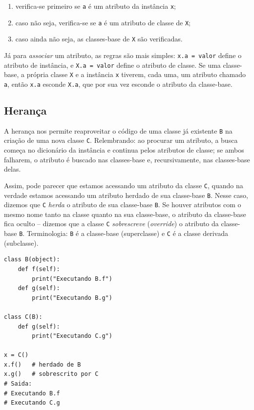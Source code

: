 \documentclass[11pt,a4paper]{article}
\begin{document}
\begin{enumerate}
\item verifica-se primeiro se \texttt{a} é um atributo da instância \texttt{x};
\item caso não seja, verifica-se se \texttt{a} é um atributo de classe de \texttt{X};
\item caso ainda não seja, as classes-base de \texttt{X} são verificadas.
\end{enumerate}

Já para \emph{associar} um atributo, as regras são mais simples:
\texttt{x.a = valor} define o atributo de instância, e \texttt{X.a =
valor} define o atributo de classe. Se uma classe-base, a própria classe
\texttt{X} e a instância \texttt{x} tiverem, cada uma, um atributo chamado
\texttt{a}, então \texttt{x.a} esconde \texttt{X.a}, que por sua vez
esconde o atributo da classe-base.

\subsection{Herança}

A herança nos permite reaproveitar o código de uma classe já existente
\texttt{B} na criação de uma nova classe \texttt{C}. Relembrando: ao
procurar um atributo, a busca começa no dicionário da instância e
continua pelos atributos de classe; se ambos falharem, o atributo é
buscado nas classes-base e, recursivamente, nas classes-base delas.

Assim, pode parecer que estamos acessando um atributo da classe
\texttt{C}, quando na verdade estamos acessando um atributo herdado de
sua classe-base \texttt{B}. Nesse caso, dizemos que \texttt{C}
\emph{herda} o atributo de sua classe-base \texttt{B}. Se houver
atributos com o mesmo nome tanto na classe quanto na sua classe-base, o
atributo da classe-base fica oculto -- dizemos que a classe \texttt{C}
\emph{sobrescreve} (\emph{override}) o atributo da classe-base
\texttt{B}. Terminologia: \texttt{B} é a classe-base (superclasse) e
\texttt{C} é a classe derivada (subclasse).

\begin{lstlisting}
class B(object):
    def f(self):
        print("Executando B.f")
    def g(self):
        print("Executando B.g")

class C(B):
    def g(self):
        print("Executando C.g")

x = C()
x.f()   # herdado de B
x.g()   # sobrescrito por C
# Saida:
# Executando B.f
# Executando C.g
\end{lstlisting}
\end{document}
